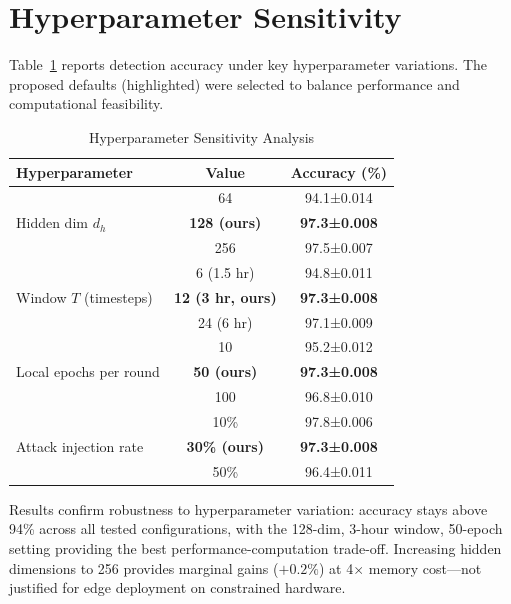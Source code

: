 \documentclass[journal]{IEEEtran}
\begin{document}
\section{Hyperparameter Sensitivity}
\label{app:hyperparams}

Table~\ref{tab:hyperparams} reports detection accuracy under key hyperparameter variations. The proposed defaults (highlighted) were selected to balance performance and computational feasibility.

\begin{table}[h]
\caption{Hyperparameter Sensitivity Analysis}
\label{tab:hyperparams}
\centering
\small
\begin{tabular}{lcc}
\toprule
\textbf{Hyperparameter} & \textbf{Value} & \textbf{Accuracy (\%)} \\
\midrule
\multirow{3}{*}{Hidden dim $d_h$}
  & 64  & 94.1±0.014 \\
  & \textbf{128 (ours)} & \textbf{97.3±0.008} \\
  & 256 & 97.5±0.007 \\
\midrule
\multirow{3}{*}{Window $T$ (timesteps)}
  & 6  (1.5 hr) & 94.8±0.011 \\
  & \textbf{12 (3 hr, ours)} & \textbf{97.3±0.008} \\
  & 24 (6 hr) & 97.1±0.009 \\
\midrule
\multirow{3}{*}{Local epochs per round}
  & 10  & 95.2±0.012 \\
  & \textbf{50 (ours)} & \textbf{97.3±0.008} \\
  & 100 & 96.8±0.010 \\
\midrule
\multirow{3}{*}{Attack injection rate}
  & 10\% & 97.8±0.006 \\
  & \textbf{30\% (ours)} & \textbf{97.3±0.008} \\
  & 50\% & 96.4±0.011 \\
\bottomrule
\end{tabular}
\end{table}

Results confirm robustness to hyperparameter variation: accuracy stays above 94\% across all tested configurations, with the 128-dim, 3-hour window, 50-epoch setting providing the best performance-computation trade-off. Increasing hidden dimensions to 256 provides marginal gains ($+0.2\%$) at 4$\times$ memory cost—not justified for edge deployment on constrained hardware.
\end{document}
